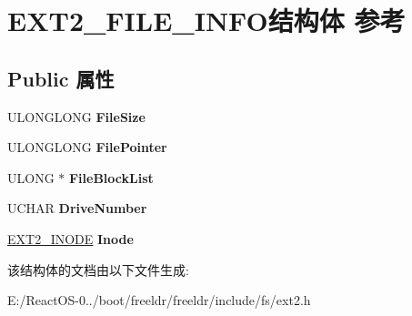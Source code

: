 \hypertarget{struct_e_x_t2___f_i_l_e___i_n_f_o}{}\section{E\+X\+T2\+\_\+\+F\+I\+L\+E\+\_\+\+I\+N\+F\+O结构体 参考}
\label{struct_e_x_t2___f_i_l_e___i_n_f_o}
\subsection*{Public 属性}
\begin{DoxyCompactItemize}
\item 
\mbox{\label{struct_e_x_t2___f_i_l_e___i_n_f_o_a57b58456b3aec5b732dcfdf5c63529f1}} 
U\+L\+O\+N\+G\+L\+O\+NG {\bfseries File\+Size}
\item 
\mbox{\label{struct_e_x_t2___f_i_l_e___i_n_f_o_a5041a35feabcb6eb2b7fb4e1cb0cffd0}} 
U\+L\+O\+N\+G\+L\+O\+NG {\bfseries File\+Pointer}
\item 
\mbox{\label{struct_e_x_t2___f_i_l_e___i_n_f_o_a03642af66dd1e7ed0e2ae894b02a2a7e}} 
U\+L\+O\+NG $\ast$ {\bfseries File\+Block\+List}
\item 
\mbox{\label{struct_e_x_t2___f_i_l_e___i_n_f_o_aa30781dd39c2a62cceaada898993045b}} 
U\+C\+H\+AR {\bfseries Drive\+Number}
\item 
\mbox{\label{struct_e_x_t2___f_i_l_e___i_n_f_o_af686a11937501f737b69dde2713b6a9a}} 
\hyperlink{structext2__inode}{E\+X\+T2\+\_\+\+I\+N\+O\+DE} {\bfseries Inode}
\end{DoxyCompactItemize}


该结构体的文档由以下文件生成\+:\begin{DoxyCompactItemize}
\item 
E\+:/\+React\+O\+S-\/0../boot/freeldr/freeldr/include/fs/ext2.\+h\end{DoxyCompactItemize}
